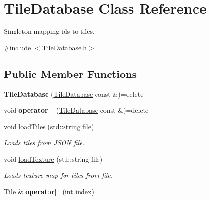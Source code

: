 \hypertarget{classTileDatabase}{\section{Tile\-Database Class Reference}
\label{classTileDatabase}
}


Singleton mapping ids to tiles.  




{\ttfamily \#include $<$Tile\-Database.\-h$>$}

\subsection*{Public Member Functions}
\begin{DoxyCompactItemize}
\item 
\hypertarget{classTileDatabase_a416e304c465d358759c5f75c2d9dd339}{{\bfseries Tile\-Database} (\hyperlink{classTileDatabase}{Tile\-Database} const \&)=delete}\label{classTileDatabase_a416e304c465d358759c5f75c2d9dd339}

\item 
\hypertarget{classTileDatabase_a6fea9bd536a262734b09a39e5b737250}{void {\bfseries operator=} (\hyperlink{classTileDatabase}{Tile\-Database} const \&)=delete}\label{classTileDatabase_a6fea9bd536a262734b09a39e5b737250}

\item 
void \hyperlink{classTileDatabase_a986e55f0705dbfb5428931563eff1497}{load\-Tiles} (std\-::string file)
\begin{DoxyCompactList}\small\item\em Loads tiles from J\-S\-O\-N file. \end{DoxyCompactList}\item 
\hypertarget{classTileDatabase_a1eb9f7c3ff7e497bada7a1475fb271f4}{void \hyperlink{classTileDatabase_a1eb9f7c3ff7e497bada7a1475fb271f4}{load\-Texture} (std\-::string file)}\label{classTileDatabase_a1eb9f7c3ff7e497bada7a1475fb271f4}

\begin{DoxyCompactList}\small\item\em Loads texture map for tiles from file. \end{DoxyCompactList}\item 
\hypertarget{classTileDatabase_afd8392440590a9a162104d27f93001a8}{\hyperlink{classTile}{Tile} \& {\bfseries operator\mbox{[}$\,$\mbox{]}} (int index)}\label{classTileDatabase_afd8392440590a9a162104d27f93001a8}

\end{DoxyCompactItemize}
